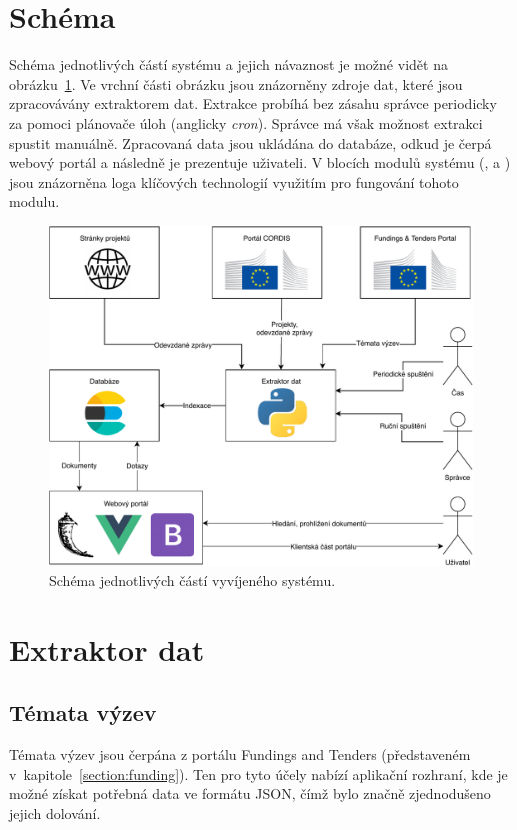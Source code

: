 \section{Schéma}
Schéma jednotlivých částí systému a jejich návaznost je možné vidět na obrázku~\ref{img:scheme}. Ve vrchní části obrázku jsou znázorněny zdroje dat, které jsou zpracovávány extraktorem dat. Extrakce probíhá bez zásahu správce periodicky za pomoci plánovače úloh (anglicky \emph{cron}). Správce má však možnost extrakci spustit manuálně. Zpracovaná data jsou ukládána do databáze, odkud je čerpá webový portál a následně je prezentuje uživateli. V blocích modulů systému (,  a ) jsou znázorněna loga klíčových technologií využitím pro fungování tohoto modulu.

\begin{figure}[H]
	\centering
	\includegraphics[width=\textwidth]{obrazky-figures/my-scheme.pdf}
	\caption{Schéma jednotlivých částí vyvíjeného systému.}
	\label{img:scheme}
\end{figure}

\section{Extraktor dat}
\blindtext

\subsection{Témata výzev}
Témata výzev jsou čerpána z portálu Fundings and Tenders (představeném v~kapitole~\ref{section:funding}).
Ten pro tyto účely nabízí aplikační rozhraní, kde je možné získat potřebná data ve formátu JSON, čímž bylo značně zjednodušeno jejich dolování. 

